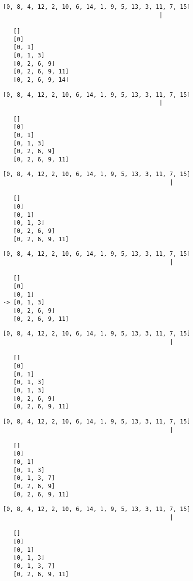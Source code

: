 { \begin{verbatim}
[0, 8, 4, 12, 2, 10, 6, 14, 1, 9, 5, 13, 3, 11, 7, 15]
                                             |

   []
   [0]
   [0, 1]
   [0, 1, 3]
   [0, 2, 6, 9]
   [0, 2, 6, 9, 11]
   [0, 2, 6, 9, 14]
\end{verbatim} }

{ \begin{verbatim}
[0, 8, 4, 12, 2, 10, 6, 14, 1, 9, 5, 13, 3, 11, 7, 15]
                                             |

   []
   [0]
   [0, 1]
   [0, 1, 3]
   [0, 2, 6, 9]
   [0, 2, 6, 9, 11]

\end{verbatim} }

{ \begin{verbatim}
[0, 8, 4, 12, 2, 10, 6, 14, 1, 9, 5, 13, 3, 11, 7, 15]
                                                |

   []
   [0]
   [0, 1]
   [0, 1, 3]
   [0, 2, 6, 9]
   [0, 2, 6, 9, 11]

\end{verbatim} }

{ \begin{verbatim}
[0, 8, 4, 12, 2, 10, 6, 14, 1, 9, 5, 13, 3, 11, 7, 15]
                                                |

   []
   [0]
   [0, 1]
-> [0, 1, 3]
   [0, 2, 6, 9]
   [0, 2, 6, 9, 11]

\end{verbatim} }

{ \begin{verbatim}
[0, 8, 4, 12, 2, 10, 6, 14, 1, 9, 5, 13, 3, 11, 7, 15]
                                                |

   []
   [0]
   [0, 1]
   [0, 1, 3]
   [0, 1, 3]
   [0, 2, 6, 9]
   [0, 2, 6, 9, 11]
\end{verbatim} }

{ \begin{verbatim}
[0, 8, 4, 12, 2, 10, 6, 14, 1, 9, 5, 13, 3, 11, 7, 15]
                                                |

   []
   [0]
   [0, 1]
   [0, 1, 3]
   [0, 1, 3, 7]
   [0, 2, 6, 9]
   [0, 2, 6, 9, 11]
\end{verbatim} }

{ \begin{verbatim}
[0, 8, 4, 12, 2, 10, 6, 14, 1, 9, 5, 13, 3, 11, 7, 15]
                                                |

   []
   [0]
   [0, 1]
   [0, 1, 3]
   [0, 1, 3, 7]
   [0, 2, 6, 9, 11]

\end{verbatim} }

